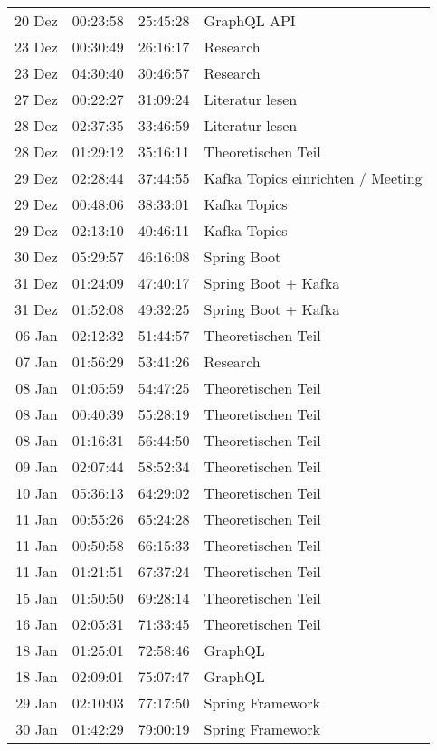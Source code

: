 \begin{longtable}{r | r | r | p{}}
	 20 Dez & 00:23:58 & 25:45:28 & GraphQL API \\ 
	 23 Dez & 00:30:49 & 26:16:17 & Research \\ 
	 23 Dez & 04:30:40 & 30:46:57 & Research \\ 
	 27 Dez & 00:22:27 & 31:09:24 & Literatur lesen \\ 
	 28 Dez & 02:37:35 & 33:46:59 & Literatur lesen \\ 
	 28 Dez & 01:29:12 & 35:16:11 & Theoretischen Teil \\ 
	 29 Dez & 02:28:44 & 37:44:55 & Kafka Topics einrichten / Meeting \\ 
	 29 Dez & 00:48:06 & 38:33:01 & Kafka Topics \\ 
	 29 Dez & 02:13:10 & 40:46:11 & Kafka Topics \\ 
	 30 Dez & 05:29:57 & 46:16:08 & Spring Boot \\ 
	 31 Dez & 01:24:09 & 47:40:17 & Spring Boot + Kafka \\ 
	 31 Dez & 01:52:08 & 49:32:25 & Spring Boot + Kafka \\ 
	 06 Jan & 02:12:32 & 51:44:57 & Theoretischen Teil \\ 
	 07 Jan & 01:56:29 & 53:41:26 & Research \\ 
	 08 Jan & 01:05:59 & 54:47:25 & Theoretischen Teil \\ 
	 08 Jan & 00:40:39 & 55:28:19 & Theoretischen Teil \\ 
	 08 Jan & 01:16:31 & 56:44:50 & Theoretischen Teil \\ 
	 09 Jan & 02:07:44 & 58:52:34 & Theoretischen Teil \\ 
	 10 Jan & 05:36:13 & 64:29:02 & Theoretischen Teil \\ 
	 11 Jan & 00:55:26 & 65:24:28 & Theoretischen Teil \\ 
	 11 Jan & 00:50:58 & 66:15:33 & Theoretischen Teil \\ 
	 11 Jan & 01:21:51 & 67:37:24 & Theoretischen Teil \\ 
	 15 Jan & 01:50:50 & 69:28:14 & Theoretischen Teil \\ 
	 16 Jan & 02:05:31 & 71:33:45 & Theoretischen Teil \\ 
	 18 Jan & 01:25:01 & 72:58:46 & GraphQL \\ 
	 18 Jan & 02:09:01 & 75:07:47 & GraphQL \\ 
	 29 Jan & 02:10:03 & 77:17:50 & Spring Framework \\ 
	 30 Jan & 01:42:29 & 79:00:19 & Spring Framework \\ 

\end{longtable}
